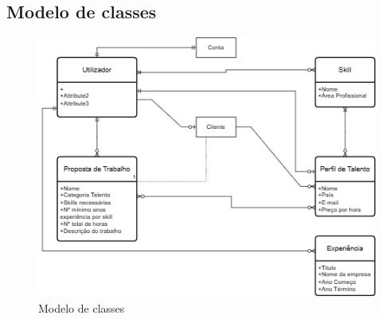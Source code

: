 \newpage

\subsection{Modelo de classes}

\begin{figure}[h]
    \centering
    \includegraphics[width=1\linewidth]{imagens/ModelodeClasses.drawio.png}
    \caption{Modelo de classes}
    \label{fig:2}
\end{figure}